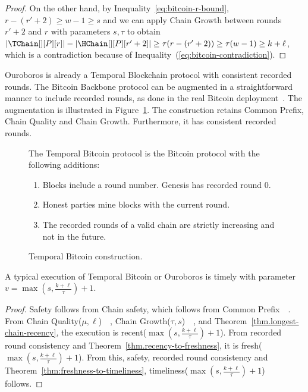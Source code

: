 \begin{proof}
  On the other hand, by Inequality~\ref{eq:bitcoin-r-bound}, $r - (r' + 2) \geq w - 1 \geq s$ and
  we can apply Chain Growth between rounds $r' + 2$ and $r$
  with parameters $s, \tau$ to obtain
  $|\TChain[][P][r]| - |\HChain[][P][r' + 2]| \geq \tau(r - (r' + 2)) \geq \tau (w - 1) \geq  k + \ell$,
  which is a contradiction because of Inequality~(\ref{eq:bitcoin-contradiction}).
  \Qed
\end{proof}

Ouroboros is already a Temporal Blockchain protocol with consistent recorded rounds.
The Bitcoin Backbone protocol can be augmented in a
straightforward manner to include recorded rounds, as done in the real Bitcoin deployment~\cite{mastering-bitcoin}.
The augmentation is illustrated in Figure~\ref{fig.temporal-backbone}.
The construction retains Common Prefix, Chain Quality and Chain Growth.
Furthermore, it has consistent recorded rounds.

\begin{figure}
  \begin{mdframed}
    The Temporal Bitcoin protocol is the Bitcoin protocol with
    the following additions:

    \begin{enumerate}
      \item Blocks include a round number. Genesis has recorded round $0$.
      \item Honest parties mine blocks with the current round.
      \item The recorded rounds of a valid chain are strictly increasing and not in the future.
    \end{enumerate}
  \end{mdframed}
  \caption{Temporal Bitcoin construction.}
  \label{fig.temporal-backbone}
\end{figure}

\begin{corollary}
  A typical execution of Temporal Bitcoin or Ouroboros is timely with parameter
  $v = \max(s, \frac{k + \ell}{\tau}) + 1$.
\end{corollary}
\begin{proof}
  Safety follows from Chain safety, which follows from Common Prefix~\cite[Theorem 15]{backbone}~\cite[Theorem 4.31]{ouroboros}.
  From Chain Quality($\mu,\ell$)~\cite[Theorem 16]{backbone}~\cite[Lemma 4.19]{ouroboros},
  Chain Growth($\tau, s$)~\cite[Theorem 12]{backbone}~\cite[Lemma 4.22]{ouroboros}, and Theorem~\ref{thm.longest-chain-recency},
  the execution is recent($\max(s, \frac{k + \ell}{\tau}) + 1$).
  From recorded round consistency and Theorem~\ref{thm.recency-to-freshness}, it is
  fresh($\max(s, \frac{k + \ell}{\tau}) + 1$).
  From this, safety, recorded round consistency and Theorem~\ref{thm:freshness-to-timeliness},
  timeliness($\max(s, \frac{k + \ell}{\tau}) + 1$) follows.
  \Qed
\end{proof}